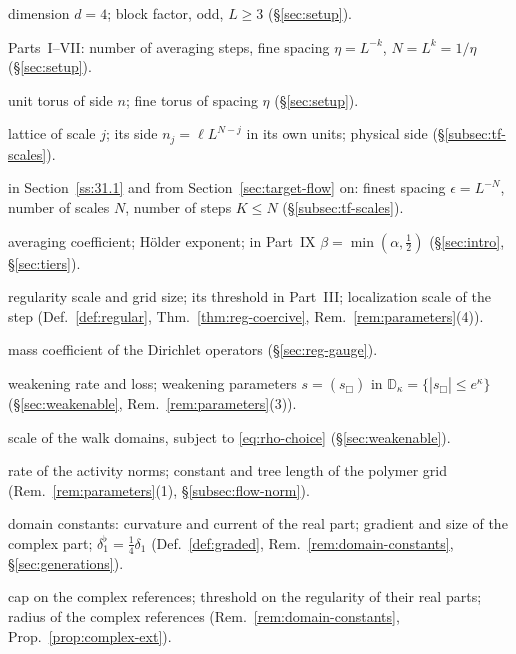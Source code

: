 {\small
\begin{description}[font=\normalfont,style=nextline,leftmargin=10em,labelwidth=9.5em,labelsep=0.5em,itemsep=1pt,parsep=0pt,topsep=4pt]
\item[$d$, $L$] dimension $d=4$; block factor, odd, $L\ge3$ (\S\ref{sec:setup}).
\item[$k$, $\eta$, $N$] Parts~I--VII: number of averaging steps, fine spacing $\eta=L^{-k}$, $N=L^k=1/\eta$ (\S\ref{sec:setup}).
\item[$\T$, $\Tf$, $n$] unit torus of side $n$; fine torus of spacing $\eta$ (\S\ref{sec:setup}).
\item[$\T^{(j)}$, $n_j$, $\ell$] lattice of scale $j$; its side $n_j=\ell L^{N-j}$ in its own units; physical side (\S\ref{subsec:tf-scales}).
\item[$\epsilon$, $N$, $K$] in Section~\ref{ss:31.1} and from Section~\ref{sec:target-flow} on: finest spacing $\epsilon=L^{-N}$, number of scales $N$, number of steps $K\le N$ (\S\ref{subsec:tf-scales}).
\item[$a$, $\alpha$, $\beta$] averaging coefficient; H\"older exponent; in Part~IX $\beta=\min(\alpha,\frac12)$ (\S\ref{sec:intro}, \S\ref{sec:tiers}).
\item[$M$, $M_0$, $M'$] regularity scale and grid size; its threshold in Part~III; localization scale of the step (Def.~\ref{def:regular}, Thm.~\ref{thm:reg-coercive}, Rem.~\ref{rem:parameters}(4)).
\item[$\kappa_m$] mass coefficient of the Dirichlet operators (\S\ref{sec:reg-gauge}).
\item[$\kappa$, $\delta$, $s$, $\mathbb D_\kappa$] weakening rate and loss; weakening parameters $s=(s_\Box)$ in $\mathbb D_\kappa=\{|s_\Box|\le e^\kappa\}$ (\S\ref{sec:weakenable}, Rem.~\ref{rem:parameters}(3)).
\item[$\rho$] scale of the walk domains, subject to \eqref{eq:rho-choice} (\S\ref{sec:weakenable}).
\item[$\kappa_n$, $\kappa_0$, $d_M$, $d_j$] rate of the activity norms; constant and tree length of the polymer grid (Rem.~\ref{rem:parameters}(1), \S\ref{subsec:flow-norm}).
\item[$\theta_r$, $\delta_1$, $\delta_0$, $\delta_1^\flat$] domain constants: curvature and current of the real part; gradient and size of the complex part; $\delta^\flat_1=\frac14\delta_1$ (Def.~\ref{def:graded}, Rem.~\ref{rem:domain-constants}, \S\ref{sec:generations}).
\item[$\bar\delta$, $\eps_{\max}$, $\delta_P$] cap on the complex references; threshold on the regularity of their real parts; radius of the complex references (Rem.~\ref{rem:domain-constants}, Prop.~\ref{prop:complex-ext}).

\end{description}}
